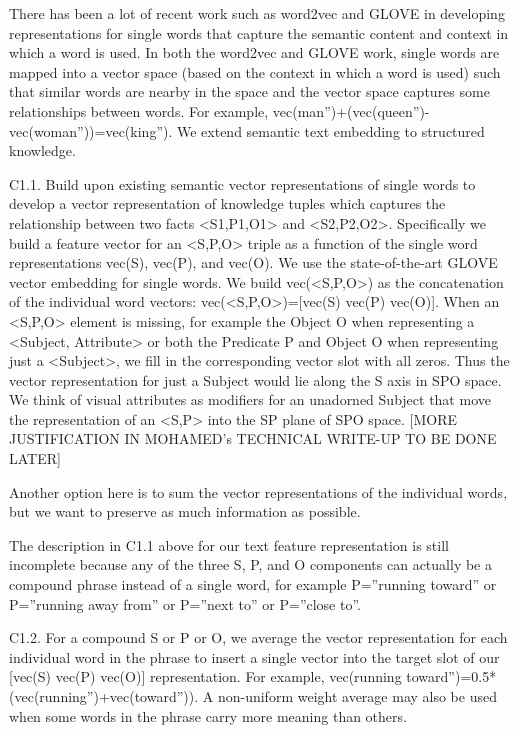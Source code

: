 \documentclass[runningheads]{llncs}
\begin{document}
There has been a lot of recent work such as word2vec and GLOVE in developing representations for single words that capture the semantic content and context in which a word is used. In both the word2vec and GLOVE work, single words are mapped into a vector space (based on the context in which a word is used) such that similar words are nearby in the space and the vector space captures some relationships between words. For example, vec(man”)+(vec(queen”)-vec(woman”))=vec(king”). We extend semantic text embedding to structured knowledge.

C1.1. Build upon existing semantic vector representations of single words to develop a vector representation of knowledge tuples which captures the relationship between two facts <S1,P1,O1> and <S2,P2,O2>. Specifically we build a feature vector for an <S,P,O> triple as a function of  the single word representations vec(S), vec(P), and vec(O). We use the state-of-the-art GLOVE vector embedding for single words. We build vec(<S,P,O>) as the concatenation of the individual word vectors: vec(<S,P,O>)=[vec(S) vec(P) vec(O)]. When an <S,P,O> element is missing, for example the Object O when representing a <Subject, Attribute> or both the Predicate P and Object O when representing just a <Subject>, we fill in the corresponding vector slot with all zeros. Thus the vector representation for just a Subject would lie along the S axis in SPO space. We think of visual attributes as modifiers for an unadorned Subject that move the representation of an <S,P> into the SP plane of SPO space. [MORE JUSTIFICATION IN MOHAMED’s TECHNICAL WRITE-UP TO BE DONE LATER]

Another option here is to sum the vector representations of the individual words, but we want to preserve as much information as possible.

The description in C1.1 above for our text feature representation is still incomplete because any of the three S, P, and O components can actually be a compound phrase instead of a single word, for example P=”running toward” or P=”running away from” or P=”next to” or P=”close to”.

C1.2. For a compound S or P or O, we average the vector representation for each individual word in the phrase to insert a single vector into the target slot of our [vec(S) vec(P) vec(O)] representation. For example, vec(running toward”)=0.5*(vec(running”)+vec(toward”)). A non-uniform weight average may also be used when some words in the phrase carry more meaning than others.
\end{document}
